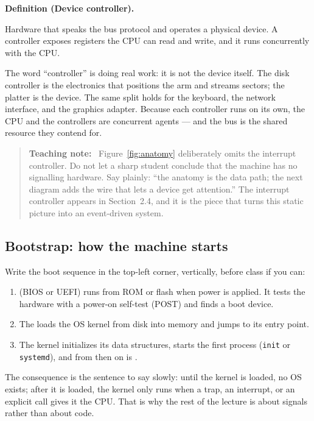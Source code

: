 \documentclass[11pt]{article}
\newenvironment{definitionbox}[1]{%
  \par\noindent\textbf{Definition (#1).}\ \itshape
}{\par\vspace{0.3em}}
\newenvironment{teachingaside}{\begin{quote}\small\color{primary-gold}\textbf{Teaching note:}\ }{\end{quote}}
\begin{document}
\begin{definitionbox}{Device controller}
Hardware that speaks the bus protocol and operates a physical device. A
controller exposes registers the CPU can read and write, and it runs
concurrently with the CPU.
\end{definitionbox}

The word ``controller'' is doing real work: it is not the device itself. The
disk controller is the electronics that positions the arm and streams sectors;
the platter is the device. The same split holds for the keyboard, the network
interface, and the graphics adapter. Because each controller runs on its own,
the CPU and the controllers are concurrent agents --- and the bus is the shared
resource they contend for.

\begin{teachingaside}
Figure~\ref{fig:anatomy} deliberately omits the interrupt controller. Do not
let a sharp student conclude that the machine has no signalling hardware. Say
plainly: ``the anatomy is the data path; the next diagram adds the wire that
lets a device get attention.'' The interrupt controller appears in
Section~2.4, and it is the piece that turns this static picture into an
event-driven system.
\end{teachingaside}

\subsection*{Bootstrap: how the machine starts}

Write the boot sequence in the top-left corner, vertically, before class if you
can:

\begin{enumerate}
  \item {} (BIOS or UEFI) runs from ROM or flash when power is
    applied. It tests the hardware with a power-on self-test (POST) and finds a
    boot device.
  \item The  loads the OS kernel from disk into memory
    and jumps to its entry point.
  \item The kernel initializes its data structures, starts the first process
    (\texttt{init} or \texttt{systemd}), and from then on is .
\end{enumerate}

The consequence is the sentence to say slowly: until the kernel is loaded, no OS
exists; after it is loaded, the kernel only runs when a trap, an interrupt, or an
explicit call gives it the CPU. That is why the rest of the lecture is about
signals rather than about code.
\end{document}
